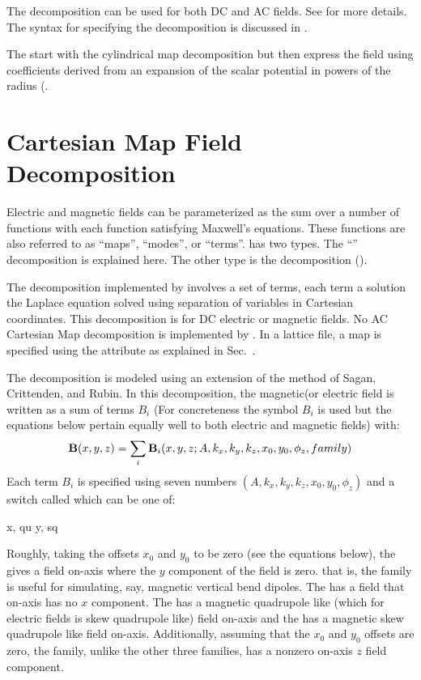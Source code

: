 The  decomposition can be used for both DC and AC fields. See
 for more details. The syntax for specifying the 
decomposition is discussed in .

The  start with the cylindrical map decomposition but then express the
field using coefficients derived from an expansion of the scalar potential in powers of the radius
(.

\section{Cartesian Map Field Decomposition}
\label{s:cart.map.phys}

Electric and magnetic fields can be parameterized as the sum over a number of functions
with each function satisfying Maxwell's equations. These functions are also referred to as
``maps'', ``modes'', or ``terms''. \bmad has two types. The ``''
decomposition is explained here. The other type is the  decomposition
().

The  decomposition implemented by \bmad involves a set of terms, each
term a solution the Laplace equation solved using separation of variables in Cartesian
coordinates. This decomposition is for DC electric or magnetic fields. No AC Cartesian Map
decomposition is implemented by \bmad. In a lattice file, a  map is specified using
the  attribute as explained in Sec.~.

The  decomposition is modeled using an extension of the method of Sagan,
Crittenden, and Rubin\cite{b:wiggler}. In this decomposition, the magnetic(or electric
field is written as a sum of terms $B_i$ (For concreteness the symbol $B_i$ is used but
the equations below pertain equally well to both electric and magnetic fields) with:
\begin{equation}
  {\bf B}(x,y,z) = \sum_i {\bf B}_i(x, y, z; A, k_x, k_y, k_z, x_0, y_0, \phi_z, family)
\end{equation}
Each term $B_i$ is specified using seven numbers $(A, k_x, k_y, k_z,
x_0, y_0, \phi_z)$ and a switch called  which can be one of:
\begin{example}
  x,  qu
  y,  sq
\end{example}
Roughly, taking the offsets $x_0$ and $y_0$ to be zero (see the equations below), the 
 gives a field on-axis where the $y$ component of the field is zero. that is, the 
family is useful for simulating, say, magnetic vertical bend dipoles. The   has a
field that on-axis has no $x$ component. The   has a magnetic quadrupole like
(which for electric fields is skew quadrupole like) field on-axis and the   has a
magnetic skew quadrupole like field on-axis. Additionally, assuming that the $x_0$ and $y_0$ offsets
are zero, the  family, unlike the other three families, has a nonzero on-axis $z$ field
component.

